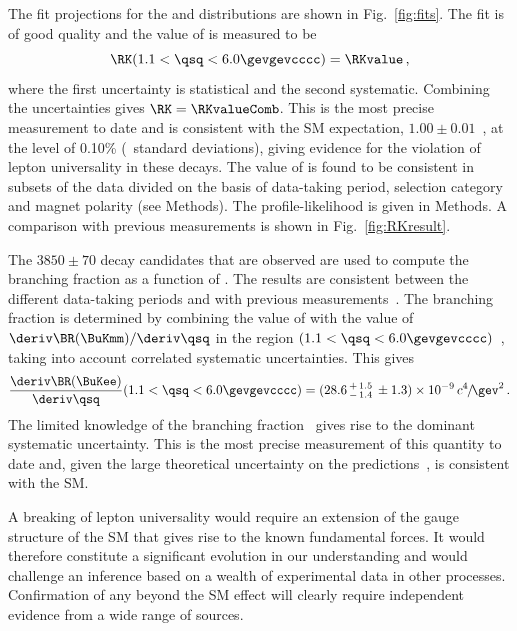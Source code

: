 The fit projections for the \mKll and \mKllconst distributions are shown in Fig.~\ref{fig:fits}. The fit is of good quality and the value of \RK is measured to be
\begin{displaymath}
\RK (1.1 < \qsq < 6.0 \gevgevcccc) = \RKvalue\,,
\end{displaymath}
\noindent where the first uncertainty is statistical and the second systematic. Combining the uncertainties gives $\RK=\RKvalueComb$.
This is the most precise measurement to date and is consistent with the SM expectation, \mbox{$1.00 \pm 0.01$}~\cite{Descotes-Genon:2015uva,Bobeth:2007,Bordone:2016gaq,EOS,Straub:2018kue}, at the level of 0.10\% (\significance~standard deviations), giving evidence for the violation of lepton universality in these decays.
The value of \RK is found to be consistent in subsets of the data divided on the basis of data-taking period, selection category and magnet polarity (see Methods).
The profile-likelihood is given in Methods. A comparison with previous measurements is shown in Fig.~\ref{fig:RKresult}.

The $3850\pm 70$ \BuKmm decay candidates that are observed are used to compute the \BuKmm  branching fraction as a function of \qsq. The results are consistent between the different data-taking periods and with previous \lhcb measurements~\cite{LHCb-PAPER-2014-006}.
The \BuKee branching fraction is determined by combining the value of \RK with the value of $\deriv\BR(\BuKmm)/\deriv\qsq$ in the region $(1.1 < \qsq < 6.0 \gevgevcccc)$~\cite{LHCb-PAPER-2014-006}, taking into account correlated systematic uncertainties. This gives
\begin{displaymath}
\frac{\deriv\BR(\BuKee)}{\deriv\qsq}(1.1 < \qsq < 6.0 \gevgevcccc)  = (28.6\,^{+\, 1.5}_{-\, 1.4} \,\pm 1.3)\times 10^{-9}\,c^4\kern -0.1em/\kern -0.15em\gev^2\,.
\end{displaymath}
\noindent The limited knowledge of the \BuJpsiK branching fraction~\cite{PDG2020} gives rise to the dominant systematic uncertainty. This is the most precise measurement of this quantity to date and, given the large theoretical uncertainty on the predictions~\cite{Khodjamirian:2017fxg,Straub:2018kue}, is consistent with the SM.


A breaking of lepton universality would require an extension of the gauge structure of the SM that gives rise to the known fundamental forces. It would therefore constitute a significant evolution in our understanding and would challenge an inference based on a wealth of experimental data in other processes. Confirmation of any beyond the SM effect will clearly require independent evidence from a wide range of sources.

